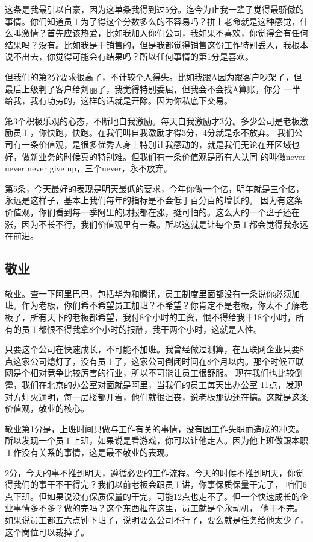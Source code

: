 \documentclass[12pt]{article}
\begin{document}
这条是我最引以自豪，因为这单条我得到过5分。迄今为止我一辈子觉得最骄傲的事情。你们知道员工为了得这个分数多么的不容易吗？拼上老命就是这种感觉，什么叫激情？首先应该热爱，比如我加入你们公司，我如果不喜欢，你觉得会有任何结果吗？没有。比如我是干销售的，但是我都觉得销售这份工作特别丢人，我根本说不出去，你觉得可能会有结果吗？所以任何事情的第1分是喜欢。

但我们的第2分要求很高了，不计较个人得失。比如我跟A因为跟客户吵架了，但最后上级判了客户给刘丽了，我觉得特别委屈，但我会不会找A算账，你分 一半给我，我有功劳的，这样的话就是开除。因为你私底下交易。

第3个积极乐观的心态，不断地自我激励。每天自我激励才3分。多少公司是老板激励员工，你快跑，快跑。在我们叫自我激励才得3分，4分就是永不放弃。 我们公司有一条价值观，是很多优秀人身上特别让我感动的，就是我们无论在开区域也好，做新业务的时候真的特别难。但我们有一条价值观是所有人认同 的叫做never never never give up，三个never，永不放弃。

第5条，今天最好的表现是明天最低的要求，今年你做一个亿，明年就是三个亿，永远是这样子，基本上我们每年的指标是不会低于百分百的增长的。 因为有这条价值观，你们看到每一季阿里的财报都在涨，挺可怕的。这么大的一个盘子还在涨，因为不长不行，我们价值观里有一条。所以这就是让每个员工都会觉得我永远在前进。

\subsection{敬业}
敬业。查一下阿里巴巴，包括华为和腾讯，员工制度里面都没有一条说你必须加班。作为老板，你们希不希望员工加班？不希望？你肯定不是老板，你太不了解老板了，所有天下的老板都希望，我付8个小时的工资，恨不得给我干18个小时，所有的员工都恨不得我拿8个小时的报酬，我干两个小时，这就是人性。

只要这个公司在快速成长，不可能不加班。我曾经做过测算，在互联网企业只要8点这家公司熄灯了，没有员工了，这家公司倒闭时间在8个月以内。那个时候互联网是个相对竞争比较厉害的行业，所以不可能让员工很舒服。 现在我们也比较倒霉，我们在北京的办公室对面就是阿里，当我们的员工每天出办公室 11点，发现对方灯火通明，每一层楼都开着，他们就很沮丧，说老板那边还在搞。这就是这条价值观，敬业的核心。

敬业第1分是，上班时间只做与工作有关的事情，没有因工作失职而造成的冲突。所以发现一个员工上班，如果说是看游戏，你可以让他走人。因为他上班做跟本职工作没有关系的事情，这是最不敬业的表现。

2分，今天的事不推到明天，遵循必要的工作流程。今天的时候不推到明天，你觉得我们的事干不干得完？我们以前老板会跟员工讲，你事保质保量干完了， 咱们6点下班。但如果说没有保质保量的干完，可能12点也走不了。但一个快速成长的企业事情多不多？做的完吗？这个东西框在这里，员工就是个永动机， 他干不完。如果说员工都五六点钟下班了，说明要么公司不行了，要么就是任务给他太少了，这个岗位可以裁掉了。
\end{document}

